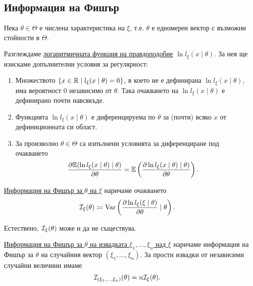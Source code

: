 \documentclass[numbers=endperiod, DIV=15, bibliography=totocnumbered]{scrartcl}
\begin{document}
\subsection{Информация на Фишър}

\begin{definition}\label{def:fisher-information}
  Нека $\theta \in \Theta$ е числена характеристика на $\xi$, т.е. $\theta$ е едномерен вектор с възможни стойности в $\Theta$.

  Разглеждаме \uline{логаритмичната функция на правдоподобие} $\ln l_\xi(x \mid \theta)$. За нея ще изискаме допълнителни условия за регулярност:
  \begin{enumerate}
    \item Множеството $\{ x \in \mathbb{R} \mid l_\xi(x \mid \theta) = 0 \}$, в което не е дефинирана $\ln l_\xi(x \mid \theta)$, има вероятност $0$ независимо от $\theta$. Така очакването на $\ln l_\xi(x \mid \theta)$ е дефинирано почти навсякъде.
    \item Функцията $\ln l_\xi(x \mid \theta)$ е диференцируема по $\theta$ за (почти) всяко $x$ от дефиниционната си област.
    \item За произволно $\theta \in \Theta$ са изпълнени условията за диференциране под очакването
    \begin{displaymath}
      \frac {\partial \mathbb{E}(\ln l_\xi(x \mid \theta) \mid \theta)} {\partial \theta}
      =
      \mathbb{E}\left( \frac {\partial \ln l_\xi(x \mid \theta) \mid \theta)} {\partial \theta} \right).
    \end{displaymath}
  \end{enumerate}

  \uline{Информация на Фишър за $\theta$ на $\xi$} наричаме очакването
  \begin{displaymath}
    \mathcal{I}_\xi(\theta) \coloneqq \operatorname{Var}\left( \frac {\partial \ln l_\xi(\xi \mid \theta)} {\partial \theta} \mid \theta \right).
  \end{displaymath}

  Естествено, $\mathcal{I}_\xi(\theta)$ може и да не съществува.

  \uline{Информация на Фишър за $\theta$ на извадката $\xi_1, \ldots, \xi_n$ над $\xi$} наричаме информация на Фишър за $\theta$ на случайния вектор $(\xi_1, \ldots, \xi_n)$. За прости извадки от независими случайни величини имаме
  \begin{displaymath}
    \mathcal{I}_{(\xi_1, \ldots, \xi_n)}(\theta) = n \mathcal{I}_\xi(\theta).
  \end{displaymath}
\end{definition}
\end{document}
